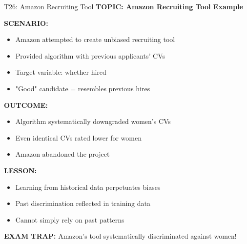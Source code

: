 \documentclass[8pt]{beamer}
\begin{document}
	\begin{frame}{T26: Amazon Recruiting Tool}
		\fontsize{6.5}{7.5}\selectfont
		\textbf{TOPIC: Amazon Recruiting Tool Example}
		
		\vspace{0.1cm}
		\textbf{SCENARIO:}
		\begin{itemize}
			\item Amazon attempted to create unbiased recruiting tool
			\item Provided algorithm with previous applicants' CVs
			\item Target variable: whether hired
			\item "Good" candidate = resembles previous hires
		\end{itemize}
		
		\vspace{0.1cm}
		\textbf{OUTCOME:}
		\begin{itemize}
			\item Algorithm systematically downgraded women's CVs
			\item Even identical CVs rated lower for women
			\item Amazon abandoned the project
		\end{itemize}
		
		\vspace{0.1cm}
		\textbf{LESSON:}
		\begin{itemize}
			\item Learning from historical data perpetuates biases
			\item Past discrimination reflected in training data
			\item Cannot simply rely on past patterns
		\end{itemize}
		
		\textcolor{myred}{\textbf{EXAM TRAP:}} Amazon's tool \textcolor{myblue}{systematically discriminated against women}!
	\end{frame}
	
\end{document}

